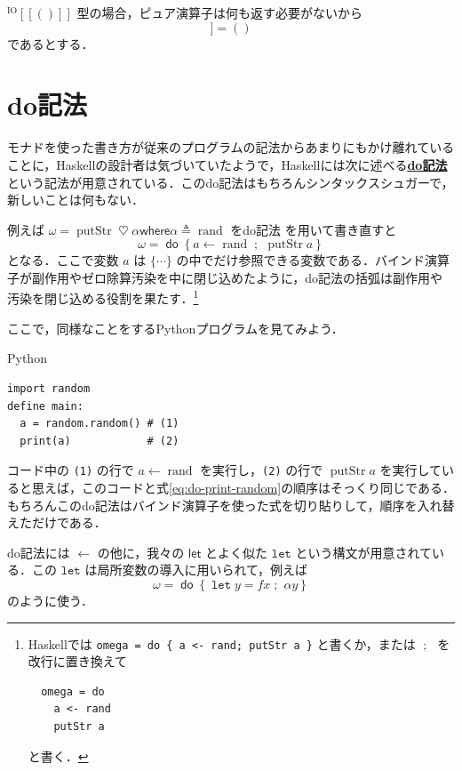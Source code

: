 \documentclass[a5paper,twoside,fleqn,draft]{jsbook}
\def\[{[\![}
\def\]{]\!]}
\newcommand{\programminglanguage}[1]{\textsf{#1}}
\newcommand{\haskell}{\programminglanguage{Haskell}}
\newcommand{\python}{\programminglanguage{Python}}
\newcommand{\keyword}[1]{{\underline{\textbf{#1}}}}
\newcommand{\code}[1]{\texttt{#1}}
\newenvironment{pythoncode}{\begin{itembox}[r]{\python}}{\end{itembox}}
\newcommand{\mKeyword}[1]{\mathsf{#1}}
\newcommand{\mVarKeyword}[1]{\texttt{#1}}
\newcommand{\mDoKeyword}{\mKeyword{do}}
\newcommand{\mDoLetKeyword}{\mVarKeyword{let}}
\newcommand{\mLetKeyword}{\mKeyword{let}}
\newcommand{\mWhereKeyword}{\mKeyword{where}}
\DeclareMathOperator{\mDoKW}{\mDoKeyword}
\newcommand{\mAction}[1]{\mathrm{#1}}
\DeclareMathOperator{\mPutStr}{\mAction{putStr}}
\DeclareMathOperator{\mRand}{\mAction{rand}}
\DeclareMathOperator{\mBind}{\heartsuit}
\DeclareMathOperator{\mDoEq}{\leftarrow}
\DeclareMathOperator{\mDoLetEq}{\mVarKeyword{=}}
\DeclareMathOperator{\mDoNext}{;\;}
\DeclareMathOperator{\mLetEq}{\triangleq}
\newcommand{\mType}[1]{\mathbf{#1}} %
\newcommand{\mUnitType}{\mType{()}}
\newcommand{\mTypeAssemble}[2]{{}^\mathrm{#1}\[\mType{#2}\]}
\newcommand{\mIOType}[1]{\mTypeAssemble{IO}{#1}}
\newcommand{\mIOUnitType}{\mIOType{\mUnitType}}
\newcommand{\mPureWith}[1]{\[#1\]}
\newcommand{\mTupleWith}[1]{\left(#1\right)}
\newcommand{\mDo}[1]{\mDoKW\left\{#1\right\}}
\newcommand{\mDoLet}[2]{\mathop{\mDoLetKeyword}#1\mDoLetEq#2}
\newcommand{\mWhereIsEXP}[2]{\mathbin{\mWhereKeyword}#1\mLetEq#2} %
\begin{document}
$\mIOUnitType$ 型の場合，ピュア演算子は何も返す必要がないから
\begin{equation}
\mPureWith{\_}=()
\end{equation}
であるとする．





\section{do記法}

モナドを使った書き方が従来のプログラムの記法からあまりにもかけ離れていることに，\haskell の設計者は気づいていたようで，\haskell には次に述べる\keyword{do記法}という記法が用意されている．このdo記法はもちろんシンタックスシュガーで，新しいことは何もない．

例えば $\omega=\mPutStr\mBind\alpha\mWhereIsEXP{\alpha}{\mRand}$ をdo記法
を用いて書き直すと
\begin{equation}
\label{eq:do-print-random}
\omega=\mDo{a\mDoEq\mRand\mDoNext\mPutStr a}
\end{equation}
となる．ここで変数 $a$ は $\{\dotsb\}$ の中でだけ参照できる変数である．バインド演算子が副作用やゼロ除算汚染を中に閉じ込めたように，do記法の括弧は副作用や汚染を閉じ込める役割を果たす．\footnote{\haskell では \code{omega = do \{ a <- rand; putStr
a \}} と書くか，または $\mDoNext$ を改行に置き換えて
\begin{verbatim}
  omega = do
    a <- rand
    putStr a
\end{verbatim}
と書く．}

ここで，同様なことをする\python プログラムを見てみよう．
\begin{pythoncode}
\begin{verbatim}
import random
define main:
  a = random.random() # (1)
  print(a)            # (2)
\end{verbatim}
\end{pythoncode}
コード中の \code{(1)} の行で $a\mDoEq\mRand$ を実行し，\code{(2)} の行で $\mPutStr a$ を実行していると思えば，このコードと式\eqref{eq:do-print-random}の順序はそっくり同じである．もちろんこのdo記法はバインド演算子を使った式を切り貼りして，順序を入れ替えただけである．

do記法には $\mDoEq$ の他に，我々の $\mLetKeyword$ とよく似た $\mDoLetKeyword$ という構文が用意されている．この $\mDoLetKeyword$ は局所変数の導入に用いられて，例えば
\begin{equation}
\omega=\mDo{\mDoLet{y}{fx}\mDoNext\alpha y}
\end{equation}
のように使う．
\end{document}
